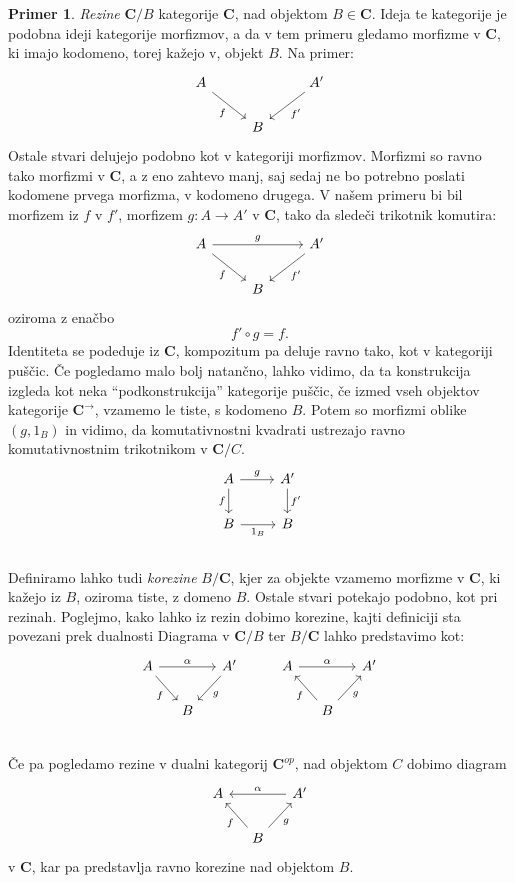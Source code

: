 \documentclass[12pt,a4paper]{book}
\theoremstyle{definition}
\theoremstyle{plain}
\theoremstyle{definition}
\newtheorem{primer}{Primer}[section]
\theoremstyle{remark}
\newcommand{\cat}[1]{\textbf{#1}}
\begin{document}
\begin{primer}
\emph{Rezine} $\cat{C}/B$ kategorije $\cat{C}$, nad objektom $B \in \cat{C}$. Ideja te kategorije je podobna ideji kategorije morfizmov, a da v tem primeru gledamo morfizme v $\cat{C}$, ki imajo kodomeno, torej kažejo v, objekt $B$. Na primer:
%
\[ \begin{tikzcd}
A \arrow[rd, "f"'] & & \arrow[ld, "f'"] A' \\
& B &
\end{tikzcd} \]
%
Ostale stvari delujejo podobno kot v kategoriji morfizmov. Morfizmi so ravno tako morfizmi v $\cat{C}$, a z eno zahtevo manj, saj sedaj ne bo potrebno poslati kodomene prvega morfizma, v kodomeno drugega. V našem primeru bi bil morfizem iz $f$ v $f'$, morfizem $g : A \to A'$ v $\cat{C}$, tako da sledeči trikotnik komutira:
%
\[ \begin{tikzcd}
A \arrow[rd, "f"'] \ar[rr, "g"] & & \arrow[ld, "f'"] A' \\
& B &
\end{tikzcd} \]
oziroma z enačbo
$$f' \circ g = f.$$
Identiteta se podeduje iz $\cat{C}$, kompozitum pa deluje ravno tako, kot v kategoriji puščic. Če pogledamo malo bolj natančno, lahko vidimo, da ta konstrukcija izgleda kot neka "`podkonstrukcija"' kategorije puščic, če izmed vseh objektov kategorije $\cat{C}^{\rightarrow}$, vzamemo le tiste, s kodomeno $B$. Potem so morfizmi oblike $(g, 1_B)$ in vidimo, da komutativnostni kvadrati ustrezajo ravno komutativnostnim trikotnikom v $\cat{C}/C$.
%
\[ \begin{tikzcd}
A \ar[d, "f"'] \ar[r, "g"] & A' \ar[d, "f'"] \\
B \ar[r, "1_B"'] & B \\
\end{tikzcd} \]
%
Definiramo lahko tudi \emph{korezine} $B/\cat{C}$, kjer za objekte vzamemo morfizme v $\cat{C}$, ki kažejo iz $B$, oziroma tiste, z domeno $B$. Ostale stvari potekajo podobno, kot pri rezinah.
Poglejmo, kako lahko iz rezin dobimo korezine, kajti definiciji sta povezani prek dualnosti
Diagrama v $\cat{C}/B$ ter $B/\cat{C}$ lahko predstavimo kot:
$$\begin{tikzcd}[column sep=small]
A \ar[dr, "f"'] \ar[rr, "\alpha"] & &  A' \ar[dl, "g"] & & A \ar[rr, "\alpha"] && A' \\
& B &  & & & B \ar[ul, "f"] \ar[ur, "g"'] & \\
\end{tikzcd}$$
Če pa pogledamo rezine v dualni kategorij $\cat{C}^{op}$, nad objektom $C$ dobimo diagram
$$\begin{tikzcd}[column sep=small]
A && A' \ar[ll, "\alpha"'] \\
& B \ar[ul, "f"] \ar[ur, "g"'] &
\end{tikzcd}$$
v $\cat{C}$, kar pa predstavlja ravno korezine nad objektom $B$.

\end{primer}
\end{document}
